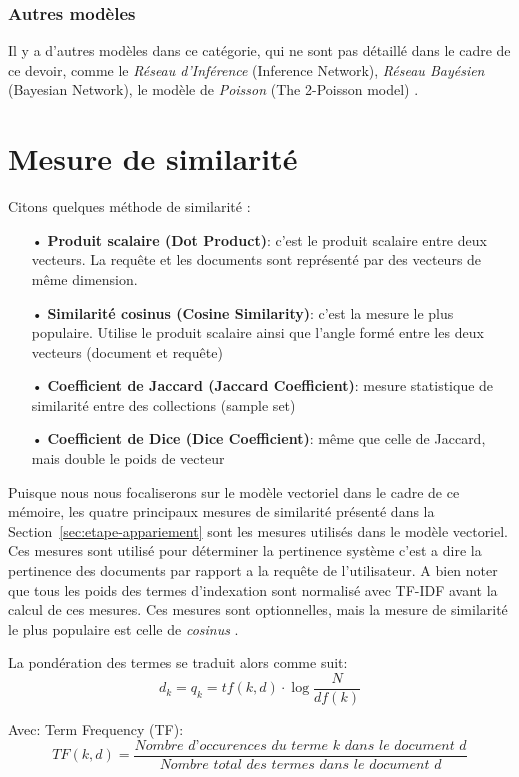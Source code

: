\subsubsection{Autres modèles}
Il y a d'autres modèles dans ce catégorie, qui ne sont pas détaillé dans le cadre de ce devoir, comme le \emph{Réseau d'Inférence} (Inference Network), \emph{Réseau Bayésien} (Bayesian Network), le modèle de \emph{Poisson} (The 2-Poisson model) \citep{model-ir}.

\section{Mesure de similarité}\label{sec:mesure-similarite}
Citons quelques méthode de similarité \citep*{vsm-for-arabic-language, sarch-engine-vsm, vsm}:
\begin{itemize}
    \item[•] \textbf{Produit scalaire (Dot Product)}: c'est le produit scalaire entre deux vecteurs. La requête et les documents sont représenté par des vecteurs de même dimension.
    \item[•] \textbf{Similarité cosinus (Cosine Similarity)}: c'est la mesure le plus populaire. Utilise le produit scalaire ainsi que l'angle formé entre les deux vecteurs (document et requête)
    \item[•] \textbf{Coefficient de Jaccard (Jaccard Coefficient)}: mesure statistique de similarité entre des collections (sample set)
    \item[•] \textbf{Coefficient de Dice (Dice Coefficient)}: même que celle de Jaccard, mais double le poids de vecteur
\end{itemize}

Puisque nous nous focaliserons sur le modèle vectoriel dans le cadre de ce mémoire, les quatre principaux mesures de similarité présenté dans la Section~\ref{sec:etape-appariement} sont les mesures utilisés dans le modèle vectoriel. Ces mesures sont utilisé pour déterminer la pertinence système c'est a dire la pertinence des documents par rapport a la requête de l'utilisateur. A bien noter que tous les poids des termes d'indexation sont normalisé avec TF-IDF avant la calcul de ces mesures. Ces mesures sont optionnelles, mais la mesure de similarité le plus populaire est celle de \emph{cosinus} \citep{vsm}.

La pondération des termes se traduit alors comme suit:
\[
    d_{k} = q_{k} = tf(k, d) \cdot \log{\frac{N}{df{(k)}}}
\]

Avec:
Term Frequency (TF):
\[
    TF(k, d) = \frac{\textit{Nombre d'occurences du terme k} \textit{ dans le document d}}{\textit{Nombre total des termes dans le document d}}
\]

